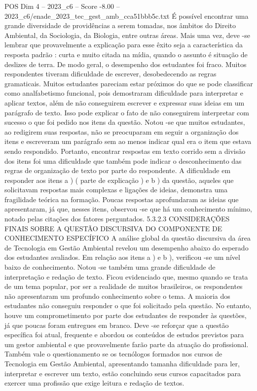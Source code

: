 \begin{textsample}{POS Dim 4 – 2023\_c6 – Score -8.00 – 2023\_c6/enade\_2023\_tec\_gest\_amb\_cca51bbb5c.txt}
É possível encontrar uma grande diversidade de providências a serem tomadas, nos âmbitos do Direito Ambiental, da Sociologia, da Biologia, entre outras áreas.
Mais uma vez, deve -se lembrar que provavelmente a explicação para esse êxito seja a característica da resposta padrão : curta e muito citada na mídia, quando o assunto é situação de deslizes de terra.
De modo geral, o desempenho dos estudantes foi fraco.
Muitos respondentes tiveram dificuldade de escrever, desobedecendo as regras gramaticais.
Muitos estudantes pareciam estar próximos do que se pode classificar como analfabetismo funcional, pois demostraram dificuldade para interpretar e aplicar textos, além de não conseguirem escrever e expressar suas ideias em um parágrafo de texto.
Isso pode explicar o fato de não conseguirem interpretar com sucesso o que foi pedido nos itens da questão.
Notou -se que muitos estudantes, ao redigirem suas respostas, não se preocuparam em seguir a organização dos itens e escreveram um parágrafo sem ao menos indicar qual era o item que estava sendo respondido.
Portanto, encontrar respostas em texto corrido sem a divisão dos itens foi uma dificuldade que também pode indicar o desconhecimento das regras de organização de texto por parte do respondente.
A dificuldade em responder aos itens a ) ( parte de explicação ) e b ) da questão, aqueles que solicitavam respostas mais complexas e ligações de ideias, demonstra uma fragilidade teórica na formação.
Poucas respostas aprofundaram as ideias que apresentaram, já que, nesses itens, observou -se que há um conhecimento mínimo, notado pelas citações dos fatores perguntados. 5.3.2.3 CONSIDERAÇÕES FINAIS SOBRE A QUESTÃO DISCURSIVA DO COMPONENTE DE CONHECIMENTO ESPECÍFICO A análise global da questão discursiva da área de Tecnologia em Gestão Ambiental revelou um desempenho abaixo do esperado dos estudantes avaliados.
Em relação aos itens a ) e b ), verificou -se um nível baixo de conhecimento.
Notou -se também uma grande dificuldade de interpretação e redação de texto.
Ficou evidenciado que, mesmo quando se trata de um tema popular, por ser a realidade de muitos brasileiros, os respondentes não apresentaram um profundo conhecimento sobre o tema.
A maioria dos estudantes não conseguiu responder o que foi solicitado pela questão.
No entanto, houve um comprometimento por parte dos estudantes de responder às questões, já que poucas foram entregues em branco.
Deve -se reforçar que a questão específica foi atual, frequente e abordou os conteúdos de estudos previstos para um gestor ambiental e que provavelmente farão parte da atuação do profissional.
Também vale o questionamento se os tecnólogos formados nos cursos de Tecnologia em Gestão Ambiental, apresentando tamanha dificuldade para ler, interpretar e escrever um texto, estão concluindo seus cursos capacitados para exercer uma profissão que exige leitura e redação de textos.

\end{textsample}
